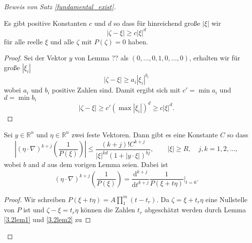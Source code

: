 \begin{proof}[Beweis von Satz \ref{fundamental_exist}]


\begin{lem}\label{3.2lem2}
Es gibt positive Konstanten $c$ und $d$ so dass für hinreichend große $|\xi|$ wir 
\begin{equation}
|\zeta- \xi|\ge c |\xi|^{d}
\end{equation} 
für alle reelle $\xi$ und alle $\zeta$ mit $P(\zeta)=0$ haben.
\end{lem} 
\begin{proof}
Sei der Vektor $y$ von Lemma ?? als $(0,\ldots, 0, 1, 0, \ldots, 0)$, erhalten wir für große $|\xi_i|$
\begin{equation}
|\zeta-\xi|\ge a_i |\xi_i|^{b_i}
\end{equation}
wobei $a_i$ und $b_i$ positive Zahlen sind. Damit ergibt sich mit $c'=\min a_i$ und $d=\min b_i$ 
\begin{equation}
|\zeta - \xi|\ge c'(\max |\xi_i|)^d \ge c |\xi|^d.
\end{equation}
\end{proof}
\begin{lem}\label{3.2lem3}
Sei $y\in \mathbb R^n$ und $\eta \in \mathbb R^n$ zwei feste Vektoren. Dann gibt es eine Konstante $C$ so dass
\begin{equation}
\left |(\eta\cdot\nabla)^{k+j} \left ( \frac{1}{P(\xi)} \right )  \right | \le \frac{(k+j)! C^{k+j}}{|\xi|^{kd} ( 1+ | y\cdot\xi | )^{bj}},\qquad  |\xi|\ge R, \quad j, k=1,2,\ldots,
\end{equation}
wobei $b$ and $d$ aus dem vorigen Lemma seien. Dabei ist
\begin{equation}
(\eta\cdot\nabla)^{k+j} \left (\frac{1}{P(\xi)} \right ) =  \frac{\mathrm d^{k+j}}{\mathrm d t^{k+j}}  \frac{1}{P(\xi+ t\eta)} \bigg|_{t=0}.
\end{equation}
\end{lem}
\begin{proof}
Wir schreiben $P(\xi+t\eta) = A \prod_{1}^m (t-t_r) $. Da $\zeta = \xi+ t_r \eta$ eine Nullstelle von $P$ ist und $\zeta - \xi = t_r \eta$ können die Zahlen $t_r$ abgeschätzt werden durch Lemma \ref{3.2lem1} und \ref{3.2lem2} zu

\end{proof}
\end{proof}
